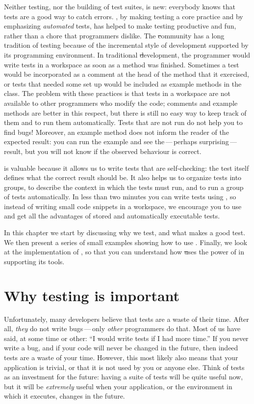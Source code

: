 \documentclass[a4paper,10pt,twoside]{book}
\begin{document}
Neither testing, nor the building of test suites, is new:  everybody knows that
tests are a good way to catch errors.
\mbox{,} by making testing a
core practice and by emphasizing \emph{automated} tests, 
has helped to make testing productive and fun, rather than a 
chore that programmers dislike.
The \st community has a long tradition of
testing because of the incremental style of development supported by its
programming environment.  
In traditional \st development, the programmer would write tests in a workspace 
as soon as a method was finished.
Sometimes a test would be incorporated as a comment at the head of the method that it exercised, or tests that needed some set up would be included as example methods in the class.
The problem with these practices is that tests in a workspace are not available to other programmers who modify the code; comments and example methods are better in this respect, 
but there is still no easy way to keep track of them and
to run them automatically.
Tests that are not run do not help you to find bugs!
Moreover, an example method does not
inform the reader of the expected result:
you can run the example and see the\,---\,perhaps surprising\,---\,result, 
but you will not know if the observed behaviour is correct.

\sunit is valuable because it allows us to write tests that are self-checking:
the test itself defines what the correct result should be.
It also helps us to
organize tests into groups, to describe the context in which the tests must run, and to
run a group of tests
automatically.  In less than two minutes you can write tests using
\sunit, so instead of writing small code snippets in a workspace, we encourage you
to use \sunit and get all the
advantages of stored and automatically executable tests.

In this chapter we start by discussing why we test, and what makes a good test. We then present a series of small 
examples showing how to use \sunit.
Finally, we look at the implementation of \sunit, so that you can understand how
\st uses the power of  in supporting its tools. 

\section{Why testing is important}

Unfortunately, many developers believe that tests are a waste of their time.  
After all, \emph{they} do not write bugs\,---\,only \emph{other} programmers do that.
Most of us have said, at some time or other:
``I would write tests if I had more time.''
If you never write a bug, and if your code will never be changed in the future,
then indeed tests are a waste of your time.
However, this most likely
also means that your application is trivial, or that it is not used by you or anyone else.  
Think of tests as an investment for the future: having a
suite of tests will be quite useful now, but it will be \emph{extremely} useful when
your application, or the environment in which it executes, changes in the future.
\end{document}
